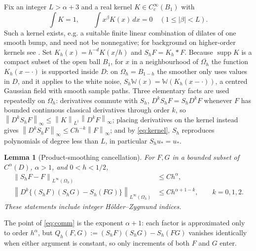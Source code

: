 \documentclass[11pt]{article}
\numberwithin{equation}{section}
\newtheorem{lemma}[theorem]{Lemma}
\newcommand{\norm}[1]{\left\|#1\right\|}
\newcommand{\supp}{\operatorname{supp}}
\begin{document}
Fix an integer $L>\alpha+3$ and a real kernel $K\in C_c^\infty(B_1)$
with
\begin{equation}\label{eq:kernel}
 \int K=1,\qquad \int x^\beta K(x)\,dx=0\quad(1\le|\beta|<L).
\end{equation}
Such a kernel exists, e.g. a suitable finite linear combination of
dilates of one smooth bump, and need not be nonnegative; for
background on higher-order kernels see \cite[Section 1.2.2]{Tsybakov}.
Set
$K_h(x)=h^{-d}K(x/h)$ and $S_hF=K_h*F$. Because
$\supp K$ is a compact subset of the open ball $B_1$, for $x$ in a
neighbourhood of $\overline{\Omega_h}$ the function $K_h(x-\cdot)$ is
supported inside $D$: on $\Omega_h=B_{1-h}$ the smoother only uses
values in $D$, and it applies to the white noise,
$S_h\mathbb W(x)=\mathbb W(K_h(x-\cdot))$, a centred Gaussian field
with smooth sample paths. Three elementary facts are used repeatedly
on $\Omega_h$: derivatives commute with $S_h$, $D^kS_hF=S_hD^kF$
whenever $F$ has bounded continuous classical derivatives through
order $k$, so $\norm{D^kS_hF}_\infty\le\norm K_{L^1}\norm{D^kF}_\infty$;
placing derivatives on the kernel instead gives
$\norm{D^kS_hF}_\infty\le Ch^{-k}\norm F_\infty$; and by
\eqref{eq:kernel}, $S_h$ reproduces polynomials of degree less than
$L$, in particular $S_hu_*=u_*$.

\begin{lemma}[Product-smoothing cancellation]\label{lem:comm}
For $F,G$ in a bounded subset of $C^\alpha(D)$, $\alpha>1$, and
$0<h<1/2$,
\begin{align}
 \norm{S_hF-F}_{L^\infty(\Omega_h)}&\le Ch^\alpha,
       \label{eq:approx}\\
 \norm{D^k\{(S_hF)(S_hG)-S_h(FG)\}}_{L^\infty(\Omega_h)}
       &\le Ch^{\alpha+1-k},\qquad k=0,1,2 .
       \label{eq:comm}
\end{align}
These statements include integer H\"older--Zygmund indices.
\end{lemma}

The point of \eqref{eq:comm} is the exponent $\alpha+1$: each factor is
approximated only to order $h^\alpha$, but
$Q_h(F,G):=(S_hF)(S_hG)-S_h(FG)$ vanishes identically when either
argument is constant, so only increments of both $F$ and $G$ enter.
\end{document}
